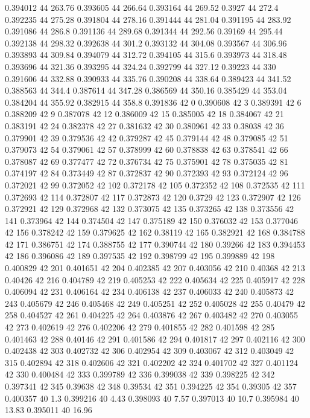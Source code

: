 0.394012 44 263.76
0.393605 44 266.64
0.393164 44 269.52
0.3927 44 272.4
0.392235 44 275.28
0.391804 44 278.16
0.391444 44 281.04
0.391195 44 283.92
0.391086 44 286.8
0.391136 44 289.68
0.391344 44 292.56
0.39169 44 295.44
0.392138 44 298.32
0.392638 44 301.2
0.393132 44 304.08
0.393567 44 306.96
0.393893 44 309.84
0.394079 44 312.72
0.394105 44 315.6
0.393973 44 318.48
0.393696 44 321.36
0.393295 44 324.24
0.392799 44 327.12
0.39223 44 330
0.391606 44 332.88
0.390933 44 335.76
0.390208 44 338.64
0.389423 44 341.52
0.388563 44 344.4
0.387614 44 347.28
0.386569 44 350.16
0.385429 44 353.04
0.384204 44 355.92
0.382915 44 358.8
0.391836 42 0
0.390608 42 3
0.389391 42 6
0.388209 42 9
0.387078 42 12
0.386009 42 15
0.385005 42 18
0.384067 42 21
0.383191 42 24
0.382378 42 27
0.381632 42 30
0.380961 42 33
0.38038 42 36
0.379901 42 39
0.379536 42 42
0.379287 42 45
0.379144 42 48
0.379085 42 51
0.379073 42 54
0.379061 42 57
0.378999 42 60
0.378838 42 63
0.378541 42 66
0.378087 42 69
0.377477 42 72
0.376734 42 75
0.375901 42 78
0.375035 42 81
0.374197 42 84
0.373449 42 87
0.372837 42 90
0.372393 42 93
0.372124 42 96
0.372021 42 99
0.372052 42 102
0.372178 42 105
0.372352 42 108
0.372535 42 111
0.372693 42 114
0.372807 42 117
0.372873 42 120
0.3729 42 123
0.372907 42 126
0.372921 42 129
0.372968 42 132
0.373075 42 135
0.373265 42 138
0.373556 42 141
0.373964 42 144
0.374504 42 147
0.375189 42 150
0.376032 42 153
0.377046 42 156
0.378242 42 159
0.379625 42 162
0.38119 42 165
0.382921 42 168
0.384788 42 171
0.386751 42 174
0.388755 42 177
0.390744 42 180
0.39266 42 183
0.394453 42 186
0.396086 42 189
0.397535 42 192
0.398799 42 195
0.399889 42 198
0.400829 42 201
0.401651 42 204
0.402385 42 207
0.403056 42 210
0.40368 42 213
0.40426 42 216
0.404789 42 219
0.405253 42 222
0.405634 42 225
0.405917 42 228
0.406094 42 231
0.406164 42 234
0.406138 42 237
0.406033 42 240
0.405873 42 243
0.405679 42 246
0.405468 42 249
0.405251 42 252
0.405028 42 255
0.40479 42 258
0.404527 42 261
0.404225 42 264
0.403876 42 267
0.403482 42 270
0.403055 42 273
0.402619 42 276
0.402206 42 279
0.401855 42 282
0.401598 42 285
0.401463 42 288
0.40146 42 291
0.401586 42 294
0.401817 42 297
0.402116 42 300
0.402438 42 303
0.402732 42 306
0.402954 42 309
0.403067 42 312
0.403049 42 315
0.402894 42 318
0.402606 42 321
0.402202 42 324
0.401702 42 327
0.401124 42 330
0.400484 42 333
0.399789 42 336
0.399038 42 339
0.398225 42 342
0.397341 42 345
0.39638 42 348
0.39534 42 351
0.394225 42 354
0.39305 42 357
0.400357 40 1.3
0.399216 40 4.43
0.398093 40 7.57
0.397013 40 10.7
0.395984 40 13.83
0.395011 40 16.96
